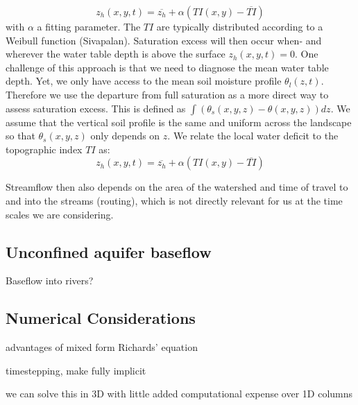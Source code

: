 \documentclass{report}
\begin{document}
 \begin{equation}
    z_h(x,y,t) = \overline{z_h} +  \alpha (TI(x,y)-\overline{TI})
\end{equation}
with $\alpha$ a fitting parameter. The $TI$ are typically distributed according to a Weibull function (Sivapalan). Saturation excess will then occur when- and wherever the water table depth is above the surface $z_h(x,y,t)=0$. One challenge of this approach is that we need to diagnose the mean water table depth. Yet, we only have access to the mean soil moisture profile $\theta_l(z,t)$. Therefore we use the departure from full saturation as a more direct way to assess saturation excess. This is defined as $\int(\theta_s(x,y,z)-\theta(x,y,z))dz$. We assume that the vertical soil profile is the same and uniform across the landscape so that $\theta_s(x,y,z)$ only depends on $z$. We relate the local water deficit to the topographic index $TI$ as:
 \begin{equation}
    z_h(x,y,t) = \overline{z_h} +  \alpha (TI(x,y)-\overline{TI})
\end{equation}

Streamflow then also depends on the area of the watershed and time of travel to and into the streams (routing), which is not directly relevant for us at the time scales we are considering.


\subsection{Unconfined aquifer baseflow}

Baseflow into rivers?


\subsection{Numerical Considerations}

advantages of mixed form Richards' equation

timestepping, make fully implicit

we can solve this in 3D with little added computational expense over 1D columns 

\citep{Clark15a}
\end{document}
